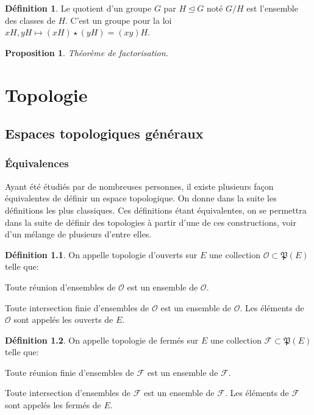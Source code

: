 \documentclass[a4paper, 11pt, french]{book}
\newenvironment{itemise}{\itemize}{\enditemize}
\let\colour=\color
\theoremstyle{plain} %
\newtheorem{proposition}{Proposition}
\theoremstyle{definition} %
\newtheorem{definition}{Définition}
\theoremstyle{remark} %
\newcommand{\1}{\mathds{1}}
\begin{document}
\begin{definition}
	Le quotient d'un groupe $G$ par $H\trianglelefteq G$ noté $G/H$ est l'ensemble des classes de $H$.
	C'est un groupe pour la loi $xH, yH\longmapsto (xH)\star(yH)=(xy)H$.
\end{definition}

\begin{proposition}
	Théorème de factorisation.
	\colour{red}{À compléter !}
\end{proposition}

\part{Topologie}

\chapter{Espaces topologiques généraux}

\section{Équivalences}

Ayant été étudiés par de nombreuses personnes, il existe plusieurs façon équivalentes de définir un espace topologique.
On donne dans la suite les définitions les plus classiques.
Ces définitions étant équivalentes, on se permettra dans la suite de définir des topologies à partir d'une de ces constructions, voir d'un mélange de plusieurs d'entre elles.

\begin{definition}
	On appelle topologie d'ouverts sur $E$ une collection $\mathscr{O}\subset\mathfrak{P}(E)$ telle que:
	\begin{itemise}
		\item Toute réunion d'ensembles de $\mathscr{O}$ est un ensemble de $\mathscr{O}$.
		\item Toute intersection finie d'ensembles de $\mathscr{O}$ est un ensemble de $\mathscr{O}$.
	\end{itemise}
	Les éléments de $\mathscr{O}$ sont appelés les ouverts de $E$.
\end{definition}

\begin{definition}
	On appelle topologie de fermés sur $E$ une collection $\mathscr{F}\subset\mathfrak{P}(E)$ telle que:
	\begin{itemise}
		\item Toute réunion finie d'ensembles de $\mathscr{F}$ est un ensemble de $\mathscr{F}$.
		\item Toute intersection d'ensembles de $\mathscr{F}$ est un ensemble de $\mathscr{F}$.
	\end{itemise}
	Les éléments de $\mathscr{F}$ sont appelés les fermés de $E$.

\end{definition}
\end{document}

